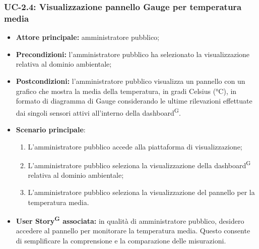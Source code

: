 \documentclass[8pt]{article}
\newcommand{\glossterm}[1]{#1\textsuperscript{G}} %
\begin{document}
\subsubsection*{UC-2.4: Visualizzazione pannello Gauge per temperatura media}
\begin{itemize}
    \item \textbf{Attore principale:} amministratore pubblico;
    \item \textbf{Precondizioni: }l'amministratore pubblico ha selezionato la visualizzazione
        relativa al dominio ambientale;
    \item \textbf{Postcondizioni:} l'amministratore pubblico visualizza un pannello con un grafico che mostra la media della temperatura, in gradi Celsius (°C), in formato di diagramma di Gauge considerando le ultime rilevazioni effettuate dai singoli sensori attivi all'interno della \glossterm{dashboard}.
    \item \textbf{Scenario principale}:
    \begin{enumerate}
    \item L’amministratore pubblico accede alla piattaforma di visualizzazione;
    \item L’amministratore pubblico seleziona la visualizzazione della \glossterm{dashboard} relativa al dominio
        ambientale; 
    \item L’amministratore pubblico seleziona la visualizzazione del pannello per la temperatura
        media.
    \end{enumerate}
\item \textbf{\glossterm{User Story} associata:} in qualità di amministratore pubblico, desidero accedere al pannello per monitorare la temperatura media. Questo consente di semplificare la comprensione e la comparazione delle misurazioni.
\end{itemize}
\end{document}
